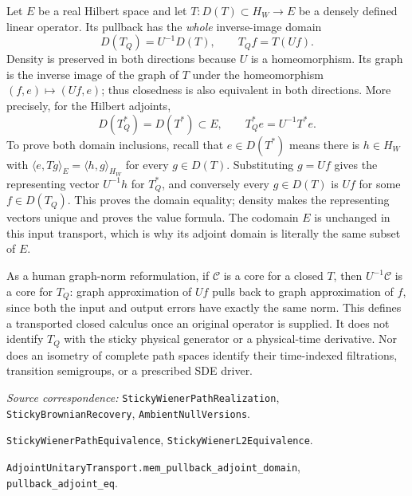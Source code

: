 \documentclass[11pt]{article}
\newcommand{\code}[1]{\texttt{\small #1}}
\begin{document}
Let $E$ be a real Hilbert space and let
$T:D(T)\subset H_W\to E$ be a densely defined linear operator.
Its pullback has the \emph{whole} inverse-image domain
\[
 D(T_Q)=U^{-1}D(T),\qquad T_Qf=T(Uf).
\]
Density is preserved in both directions because $U$ is a
homeomorphism. Its graph is the inverse image of the graph of $T$
under the homeomorphism $(f,e)\mapsto(Uf,e)$; thus closedness is
also equivalent in both directions. More precisely, for the
Hilbert adjoints,
\begin{equation}\label{eq:transportadjoint}
 D(T_Q^*)=D(T^*)\subset E,\qquad T_Q^*e=U^{-1}T^*e.
\end{equation}
To prove both domain inclusions, recall that $e\in D(T^*)$ means
there is $h\in H_W$ with
$\langle e,Tg\rangle_E=\langle h,g\rangle_{H_W}$ for every
$g\in D(T)$. Substituting $g=Uf$ gives the representing vector
$U^{-1}h$ for $T_Q^*$, and conversely every $g\in D(T)$ is
$Uf$ for some $f\in D(T_Q)$. This proves the domain equality;
density makes the representing vectors unique and proves the
value formula. The codomain $E$ is unchanged in this input
transport, which is why its adjoint domain is literally the same
subset of $E$.

As a human graph-norm reformulation, if $\mathcal C$ is a core
for a closed $T$, then $U^{-1}\mathcal C$ is a core for $T_Q$:
graph approximation of $Uf$ pulls back to graph approximation of
$f$, since both the input and output errors have exactly the same
norm. This defines a transported closed calculus once an original
operator is supplied. It does not identify $T_Q$ with the sticky
physical generator or a physical-time derivative. Nor does an
isometry of complete path spaces identify their time-indexed
filtrations, transition semigroups, or a prescribed SDE driver.

\par\noindent\begingroup\small\raggedright
\textit{Source correspondence:} \code{StickyWienerPathRealization},
\code{StickyBrownianRecovery}, \code{AmbientNullVersions}.
\par\noindent
\code{StickyWienerPathEquivalence}, \code{StickyWienerL2Equivalence}.
\par\noindent
\code{AdjointUnitaryTransport.mem\_pullback\_adjoint\_domain},
\code{pullback\_adjoint\_eq}.
\par\endgroup
\end{document}
